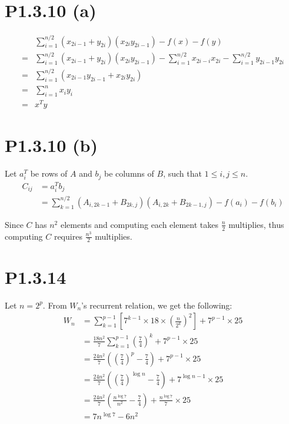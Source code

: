 \documentclass{article}
\begin{document}
\section*{P1.3.10 (a)}
\begin{align*}
      & \sum_{i=1}^{n/2}(x_{2i-1}+y_{2i})(x_{2i}y_{2i-1}) - f(x) - f(y)                                                 \\
    = & \sum_{i=1}^{n/2}(x_{2i-1}+y_{2i})(x_{2i}y_{2i-1})-\sum_{i=1}^{n/2}x_{2i-i}x_{2i}-\sum_{i=1}^{n/2}y_{2i-1}y_{2i} \\
    = & \sum_{i=1}^{n/2} (x_{2i-1}y_{2i-1}+x_{2i}y_{2i})                                                                \\
    = & \sum_{i=1}^n x_iy_i                                                                                             \\
    = & x^Ty
\end{align*}

\section*{P1.3.10 (b)}
Let $a_i^T$ be rows of $A$ and $b_j$ be columns of $B$, such that $1 \le i,j \le n$.
\begin{align*}
    C_{ij} & = a_i^Tb_j                                                                    \\
           & = \sum_{k=1}^{n/2} (A_{i,2k-1}+B_{2k,j})(A_{i,2k}+B_{2k-1,j}) - f(a_i)-f(b_i)
\end{align*}

Since $C$ has $n^2$ elements and computing each element takes $\frac{n}{2}$ multiplies, thus
computing $C$ requires $\frac{n^3}{2}$ multiplies.

\section*{P1.3.14}
Let $n=2^p$. From $W_n$'s recurrent relation, we get the following:
\begin{align*}
    W_n & = \sum_{k=1}^{p-1} \left[7^{k-1}\times 18 \times (\frac{n}{2^{k}})^2\right] + 7^{p-1}\times 25 \\
        & = \frac{18n^2}{7}\sum_{k=1}^{p-1}(\frac{7}{4})^k + 7^{p-1}\times 25                            \\
        & = \frac{24n^2}{7}((\frac{7}{4})^p-\frac{7}{4}) + 7^{p-1}\times 25                              \\
        & = \frac{24n^2}{7}((\frac{7}{4})^{\log n}-\frac{7}{4}) + 7^{\log n-1}\times 25                  \\
        & = \frac{24n^2}{7}(\frac{n^{\log7}}{n^2}-\frac{7}{4}) + \frac{n^{\log 7}}{7}\times 25           \\
        & = 7n^{\log 7} - 6n^2
\end{align*}
\end{document}

